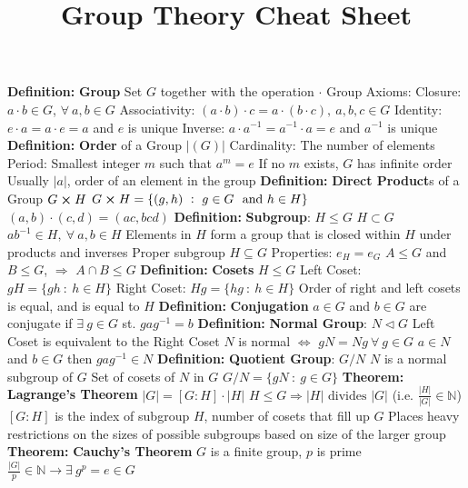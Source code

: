 \documentclass[14pt]{extarticle}
\title{Group Theory Cheat Sheet}
\def\Definition{{\color{blue} \textbf{Definition:} }}
\def\Theorem{{\color{red} \textbf{Theorem:} }}
\begin{document}
	\maketitle
	\begin{outline}		
		\1	\Definition \textbf{Group}
			\2	Set $G$ together with the operation $\cdot$
			\2	Group Axioms:
				\3	Closure:	$a \cdot b \in G$, $\forall~a,b \in G$
				\3	Associativity:	$(a \cdot b) \cdot c = a \cdot (b \cdot c),~a,b,c \in G$
				\3	Identity:	$e \cdot a = a \cdot e = a$ and $e$ is unique
				\3	Inverse: $a \cdot a^{-1} = a^{-1} \cdot a = e$ and $a^{-1}$ is unique
		\1	\Definition \textbf{Order} of a Group $|(G)|$
			\2	Cardinality:	The number of elements
			\2	Period:	Smallest integer $m$ such that $a^m = e$
				\3	If no $m$ exists, $G$ has infinite order
				\3	Usually $|a|$, order of an element in the group
		\1	\Definition \textbf{Direct Product}s of a Group $G \cross H$
			\2	$G \cross H = \{(g,h)~:~g \in G~\text{ and } h \in H\}$
			\2	$(a,b) \cdot (c,d) = (ac,bcd)$
		\1	\Definition \textbf{Subgroup}: $H \le G$
			\2	$H \subset G$
			\2	$ab^{-1} \in H,~\forall~a,b \in H$
			\2	Elements in $H$ form a group that is closed within $H$ under products and inverses
			\2	Proper subgroup $H \subseteq G$
			\2	Properties:
				\3	$e_H = e_G$
				\3	$A \le G$ and $B \le G$, $\Rightarrow$ $A \cap B \le G$
		\1	\Definition \textbf{Cosets}
			\2	$H \le G$
			\2	Left Coset:	 $gH = \{gh~:~h \in H\}$
			\2	Right Coset: $Hg = \{hg~:~h \in H\}$	
			\2	Order of right and left cosets is equal, and is equal to $H$
		\1	\Definition \textbf{Conjugation}
			\2	$a \in G$ and $b \in G$ are conjugate if $\exists~g\in G$ st. $gag^{-1} = b$
		\1	\Definition \textbf{Normal Group}: $N \triangleleft G$
			\2	Left Coset is equivalent to the Right Coset
			\2	$N$ is normal $\Leftrightarrow$ $gN = Ng~\forall~g \in G$
			\2	$a \in N$ and $b \in G$ then $gag^{-1} \in N$
		\1	\Definition \textbf{Quotient Group}: $G/N$
			\2	$N$ is a normal subgroup of $G$
			\2	Set of cosets of $N$ in $G$
			\2	$G/N = \{g N~:~g \in G\}$	
		\1	\Theorem \textbf{Lagrange's Theorem}
			\2	$|G| = [G:H] \cdot |H|$
			\2	{\color{purple}$H \le G \Rightarrow |H| \text{ divides } |G|$ 
					(i.e. $\frac{|H|}{|G|} \in \mathbb{N}$)}
			\2	$[G : H]$ is the index of subgroup $H$, number of cosets that fill
					up $G$
			\2	Places heavy restrictions on the sizes of possible subgroups based
					on size of the larger group
		\1	\Theorem \textbf{Cauchy's Theorem}
			\2	$G$ is a finite group, $p$ is prime
			\2	{\color{purple}$\frac{|G|}{p} \in \mathbb{N} \rightarrow \exists~g^p = e \in G$}

\end{outline}
\end{document}
